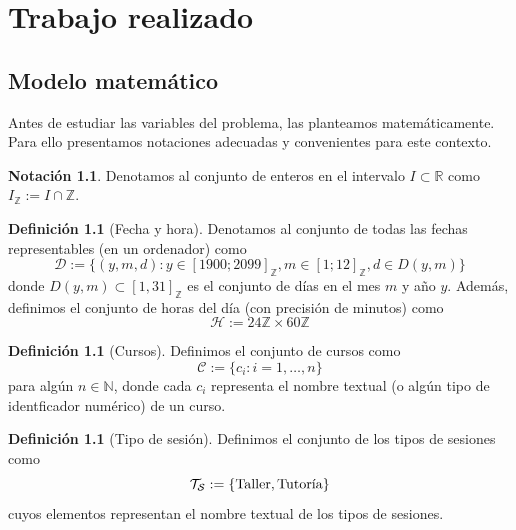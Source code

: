 \documentclass[11pt,a4paper]{book}
\theoremstyle{definition}%
\newtheorem{definicion}[teorema]{Definici\'on}
\newtheorem{notacion}[teorema]{Notaci\'on}
\newcommand{\Real}{\mathbb{R}}
\newcommand{\Integer}{\mathbb{Z}}
\begin{document}
        \chapter{Trabajo realizado}
            \section{Modelo matemático}
            Antes de estudiar las variables del problema, las planteamos matemáticamente. Para ello presentamos notaciones adecuadas y convenientes para este contexto.

            \begin{notacion}
                Denotamos al conjunto de enteros en el intervalo $I\subset\Real$ como $I_\mathbb{Z}:=I\cap\mathbb{Z}$.
            \end{notacion}
            
            \begin{definicion}[Fecha y hora]
                Denotamos al conjunto de todas las fechas representables (en un ordenador) como
                \begin{equation*}
                    \mathcal{D}:=\{(y,m,d):y\in [1900;2099]_\Integer, m\in[1;12]_\Integer, d\in D(y,m)\}
                \end{equation*}
                donde $D(y,m)\subset[1,31]_\Integer$ es el conjunto de días en el mes $m$ y año $y$. Además, definimos el conjunto de horas del día (con precisión de minutos) como
                \begin{equation*}
                    \mathcal{H}:=24\Integer\times 60\Integer
                \end{equation*}
            \end{definicion}
            
            \begin{definicion}[Cursos]
                Definimos el conjunto de cursos como
                \begin{equation*}
                    \mathcal{C}:=\{c_i: i=1,\ldots,n\}
                \end{equation*}
                para algún $n\in\mathbb{N}$, donde cada $c_i$ representa el nombre textual (o algún tipo de identficador numérico) de un curso.
            \end{definicion}

            \begin{definicion}[Tipo de sesión]
                Definimos el conjunto de los tipos de sesiones como
                \begin{equation*}
                    \mathcal{T}_\mathcal{S}:=\{\textup{Taller},\textup{Tutoría}\}
                \end{equation*}
                cuyos elementos representan el nombre textual de los tipos de sesiones.
            \end{definicion}
\end{document}
